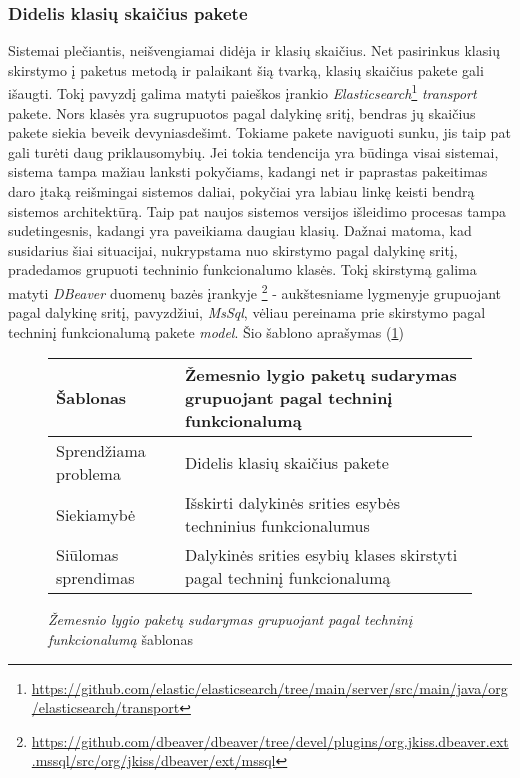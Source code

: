 \subsubsection{Didelis klasių skaičius pakete}
Sistemai plečiantis, neišvengiamai didėja ir klasių skaičius. Net pasirinkus klasių skirstymo į paketus metodą
ir palaikant šią tvarką, klasių skaičius pakete gali išaugti. Tokį pavyzdį galima matyti paieškos įrankio \textit{Elasticsearch}\footnote{\url{https://github.com/elastic/elasticsearch/tree/main/server/src/main/java/org/elasticsearch/transport}}
\textit{transport} pakete. Nors klasės yra sugrupuotos pagal dalykinę sritį, bendras jų skaičius pakete siekia beveik devyniasdešimt.
Tokiame pakete naviguoti sunku, jis taip pat gali turėti daug priklausomybių.
Jei tokia tendencija yra būdinga visai sistemai, sistema tampa mažiau lanksti pokyčiams, kadangi net ir paprastas pakeitimas
daro įtaką reišmingai sistemos daliai, pokyčiai yra labiau linkę keisti bendrą sistemos architektūrą.
Taip pat naujos sistemos versijos išleidimo  procesas tampa sudetingesnis, kadangi yra paveikiama daugiau klasių.
Dažnai matoma, kad susidarius šiai situacijai, nukrypstama nuo skirstymo pagal dalykinę sritį, pradedamos grupuoti
techninio funkcionalumo klasės. Tokį skirstymą galima matyti \textit{DBeaver} duomenų bazės įrankyje \footnote{\url{https://github.com/dbeaver/dbeaver/tree/devel/plugins/org.jkiss.dbeaver.ext.mssql/src/org/jkiss/dbeaver/ext/mssql}} -
aukštesniame lygmenyje grupuojant pagal dalykinę sritį, pavyzdžiui, \textit{MsSql}, vėliau pereinama prie skirstymo
pagal techninį funkcionalumą pakete \textit{model}.
Šio šablono aprašymas (\ref{table:technical})
\begin{figure}[H]
\begin{center}
    \begin{tabular}{|p{5cm}|p{10cm}|}
        \hline
        Šablonas & Žemesnio lygio paketų sudarymas grupuojant pagal techninį funkcionalumą \\ [0.5ex]
        \hline\hline
        Sprendžiama problema & Didelis klasių skaičius pakete\\
        \hline
        Siekiamybė & Išskirti dalykinės srities esybės techninius funkcionalumus \\
        \hline
        Siūlomas sprendimas & Dalykinės srities esybių klases skirstyti pagal techninį funkcionalumą \\
        \hline
    \end{tabular}
\end{center}
\caption{\textit{Žemesnio lygio paketų sudarymas grupuojant pagal techninį funkcionalumą} šablonas}
\label{table:technical}
\end{figure}

